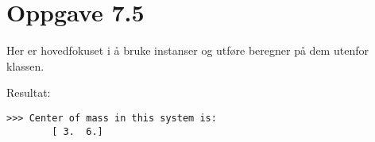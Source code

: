 \documentclass[10pt,a4paper]{article}
\begin{document}
\newpage
\section*{Oppgave 7.5}
Her er hovedfokuset i å bruke instanser og utføre beregner på dem utenfor klassen. 

Resultat:
\begin{verbatim}
>>> Center of mass in this system is:
		[ 3.  6.]
\end{verbatim}
\end{document}
